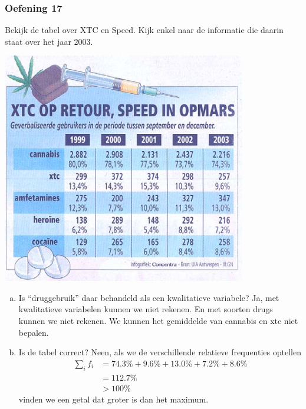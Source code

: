 \documentclass[13pt]{beamer}
\newenvironment{answer}
{\color{blue}}
{\color{black}}
\begin{document}
\begin{frame}
  \begin{minipage}{0.45\linewidth}
    \frametitle{Oefening 17}
    Bekijk de tabel over XTC en Speed. Kijk enkel naar de informatie die daarin staat over het jaar 2003.
  \end{minipage}
  \begin{minipage}{0.45\linewidth}
    \vspace*{-1cm}
    \begin{center}
      \includegraphics[width=0.8\textwidth]{tabel-drugs}
    \end{center}
  \end{minipage}
  \begin{enumerate}[(a)]
  \item Is “druggebruik” daar behandeld als een kwalitatieve variabele?
    \begin{answer}
      Ja, met kwalitatieve variabelen kunnen we niet rekenen. En met soorten drugs kunnen we niet rekenen. We kunnen het gemiddelde van cannabis en xtc niet bepalen.
    \end{answer}
  \item Is de tabel correct?
    \begin{answer}
      Neen, als we de verschillende relatieve frequenties optellen
      \begin{align*}
        \sum_i{f_i} &= 74.3\%+9.6\%+13.0\%+7.2\%+8.6\%\\[-0.4cm]
                    &= 112.7\%\\
                    &> 100\%
      \end{align*}
      vinden we een getal dat groter is dan het maximum.
    \end{answer}
  \end{enumerate}
\end{frame}
\end{document}
